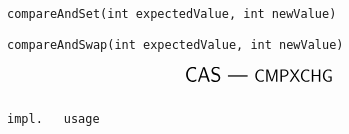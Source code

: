 \begin{frame}[fragile]{}
  \centerline{\texttt{compareAndSet(int expectedValue, int newValue)}}

  \centerline{\texttt{compareAndSwap(int expectedValue, int newValue)}}

  \[
    \text{\Large \textsf{CAS --- {\large CMPXCHG}}}
  \]

  \begin{columns}
      \begin{lstlisting}[style = Cstyle]
        impl.
      \end{lstlisting}
      \begin{lstlisting}[style = Cstyle]
        usage
      \end{lstlisting}
  \end{columns}
\end{frame}
